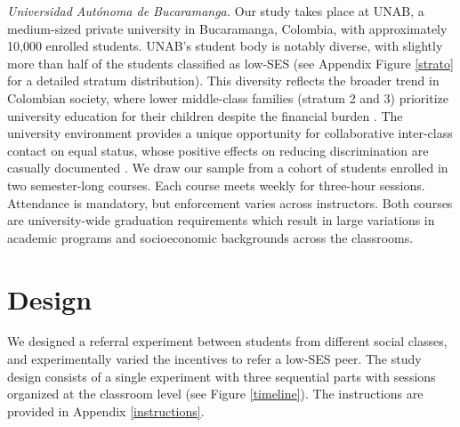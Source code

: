 \documentclass[11pt,a4paper,oneside]{article}
\begin{document}
\textit{Universidad Autónoma de Bucaramanga.}  Our study takes place at UNAB, a medium-sized private university in Bucaramanga, Colombia, with approximately 10,000 enrolled students. UNAB's student body is notably diverse, with slightly more than half of the students classified as low-SES (see Appendix Figure \ref{strato} for a detailed stratum distribution). This diversity reflects the broader trend in Colombian society, where lower middle-class families (stratum 2 and 3) prioritize university education for their children despite the financial burden \citep[p. 103]{hudson_colombia_2010}. The university environment provides a unique opportunity for collaborative inter-class contact on equal status, whose positive effects on reducing discrimination are casually documented \citep{rao2019familiarity, mousa2020building,lowe2021types}. We draw our sample from a cohort of students enrolled in two semester-long courses. Each course meets weekly for three-hour sessions. Attendance is mandatory, but enforcement varies across instructors. Both courses are university-wide graduation requirements which result in large variations in academic programs and socioeconomic backgrounds across the classrooms.



\section{Design}
We designed a referral experiment between students from different social classes, and experimentally varied the incentives to refer a low-SES peer. The study design consists of a single experiment with three sequential parts with sessions organized at the classroom level (see Figure \ref{timeline}). The instructions are provided in Appendix \ref{instructions}. 
\end{document}
